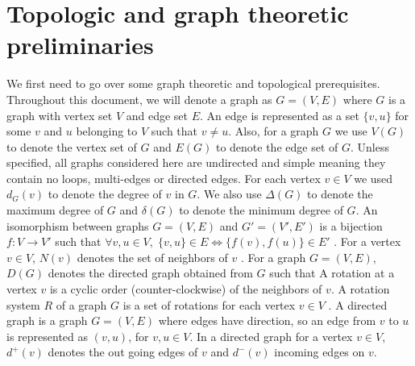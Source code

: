 \documentclass{article}
\begin{document}
   

\section{Topologic and graph theoretic preliminaries}\label{sec: prelim}
    We first need to go over some graph theoretic and topological prerequisites.
    Throughout this document, we will denote a graph as $G = (V, E)$ where $G$ is a graph with vertex set $V$ and edge set $E$. An edge is represented as a set $\{v, u\}$ for some $v$ and $u$ belonging to $V$ such that $v \neq u$. Also, for a graph $G$ we use $V(G)$ to denote the vertex set of $G$ and $E(G)$ to denote the edge set of $G$. 
    Unless specified, all graphs considered here are undirected and simple meaning they contain no loops, multi-edges or directed edges. 
    For each vertex $v\in V$ we used $d_G(v)$ to denote the degree of $v$ in $G$. We also use $\Delta(G)$ to denote the maximum degree of $G$ and $\delta(G)$ to denote the minimum degree of $G$. 
    An isomorphism between graphs $G = (V, E)$ and $G' = (V', E')$ is a bijection $f : V \to V'$ such that $\forall v, u \in V,\; \{v, u\} \in E \iff  \{f(v), f(u)\} \in E'$ \cite{Diestel97, West01}. For a vertex $v \in V$, $N(v)$ denotes the set of neighbors of $v$ \cite{Diestel97}. 
    For a graph $G = (V, E)$, $D(G)$ denotes the directed graph obtained from $G$ such that 
    A rotation at a vertex $v$ is a cyclic order (counter-clockwise) of the neighbors of $v$. A rotation system $R$ of a graph $G$ is a set of rotations for each vertex $v \in V$ \cite{Beyer16}.
    A directed graph is a graph $G  = (V, E)$ where edges have direction, so an edge from $v$ to $u$ is represented as $(v, u)$, for $v,u \in V$. In a directed graph for a vertex $v \in V$, $d^+(v)$ denotes the out going edges of $v$ and $d^-(v)$ incoming edges on $v$.
\end{document}

